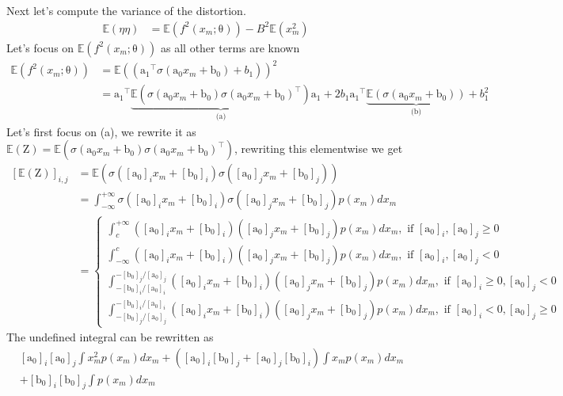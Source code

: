 \documentclass[12pt]{article}
\newcommand{\vect}[1]{\boldsymbol{\mathrm{#1}}}
\newcommand{\mat}[1]{\boldsymbol{\mathrm{#1}}}
\newcommand{\expt}[1]{\mathbb{E}\left(#1\right)}
\theoremstyle{remark}
\begin{document}
Next let's compute the variance of the distortion. 
\begin{align}
	\expt{\eta \eta} &= \expt{f^2(x_m; \vect{\theta})} - B^2\expt{x_m^2}
\end{align}
Let's focus on $\expt{f^2(x_m; \vect{\theta})}$ as all other terms are known
\begin{align}
	\expt{f^2(x_m; \vect{\theta})} &= \expt{\left(\vect{a_1}^{\intercal}\sigma(\vect{a_0}x_m + \vect{b_0}) + b_1\right)}^2\\
	&= \vect{a_1}^{\intercal}\underbrace{\expt{ \sigma(\vect{a_0}x_m + \vect{b_0}) \sigma(\vect{a_0}x_m + \vect{b_0})^{\intercal}}}_{\text{(a)}}\vect{a_1} + 2b_1 \vect{a_1}^{\intercal} \underbrace{\expt{\sigma(\vect{a_0}x_m + \vect{b_0})}}_{\text{(b)}} + b_1^2
\end{align}
Let's first focus on (a), we rewrite it as $\expt{\mat{Z}} = \expt{ \sigma(\vect{a_0}x_m + \vect{b_0}) \sigma(\vect{a_0}x_m + \vect{b_0})^{\intercal}}$, rewriting this elementwise we get
\begin{align}
	\left[\expt{\mat{Z}}\right]_{i,j} &= \expt{\sigma([\vect{a_0}]_i x_m + [\vect{b_0}]_i) \sigma([\vect{a_0}]_j x_m + [\vect{b_0}]_j)}\\
	&= \int_{-\infty}^{+\infty} \sigma([\vect{a_0}]_i x_m + [\vect{b_0}]_i) \sigma([\vect{a_0}]_j x_m + [\vect{b_0}]_j) p(x_m)dx_m \\
	&= \begin{cases}
		\int_{c}^{+\infty} ([\vect{a_0}]_i x_m + [\vect{b_0}]_i) ([\vect{a_0}]_j x_m + [\vect{b_0}]_j) p(x_m)dx_m, \text{ if } [\vect{a_0}]_i, [\vect{a_0}]_j \geq 0 \\
		\int_{-\infty}^{c} ([\vect{a_0}]_i x_m + [\vect{b_0}]_i) ([\vect{a_0}]_j x_m + [\vect{b_0}]_j) p(x_m)dx_m , \text{ if } [\vect{a_0}]_i, [\vect{a_0}]_j < 0 \\
		\int_{-[\vect{b_0}]_i/[\vect{a_0}]_i}^{-[\vect{b_0}]_j/[\vect{a_0}]_j} ([\vect{a_0}]_i x_m + [\vect{b_0}]_i) ([\vect{a_0}]_j x_m + [\vect{b_0}]_j) p(x_m)dx_m , \text{ if } [\vect{a_0}]_i \geq 0, [\vect{a_0}]_j < 0 \\
		\int_{-[\vect{b_0}]_j/[\vect{a_0}]_j}^{-[\vect{b_0}]_i/[\vect{a_0}]_i} ([\vect{a_0}]_i x_m + [\vect{b_0}]_i) ([\vect{a_0}]_j x_m + [\vect{b_0}]_j) p(x_m)dx_m , \text{ if } [\vect{a_0}]_i < 0, [\vect{a_0}]_j \geq 0 
	\end{cases}
\end{align}
The undefined integral can be rewritten as
\begin{align*}
	&[\vect{a_0}]_i [\vect{a_0}]_j \int x_m^2 p(x_m)dx_m + \left([\vect{a_0}]_i [\vect{b_0}]_j  +  [\vect{a_0}]_j [\vect{b_0}]_i \right) \int x_m p(x_m)dx_m \\&+  [\vect{b_0}]_i [\vect{b_0}]_j \int p(x_m)dx_m 
\end{align*}
\end{document}
